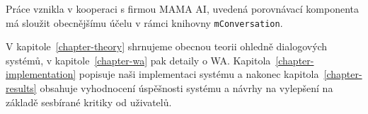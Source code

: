 Práce vznikla v kooperaci s firmou MAMA AI, uvedená porovnávací komponenta má
sloužit obecnějšímu účelu v rámci kni\-ho\-vny \texttt{mConversation}.

V kapitole~\ref{chapter-theory} shrnujeme obecnou teorii ohledně dialogových
systémů, v kapitole~\ref{chapter-wa} pak detaily o WA. Kapitola~\ref{chapter-implementation}
popisuje naši implementaci systému a nakonec kapitola~\ref{chapter-results}
obsahuje vyhodnocení úspěšnosti systému a návrhy na vylepšení
na základě sesbírané kritiky od uživatelů.